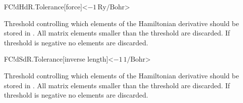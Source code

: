 \begin{fdfentry}{FC!dHdR.Tolerance}[force]<$-1\,\mathrm{Ry/Bohr}$>

  Threshold controlling which elements of the Hamiltonian derivative should be
  stored in . All matrix elements smaller than the threshold
  are discarded. If threshold is negative no elements are discarded.

\end{fdfentry}


\begin{fdfentry}{FC!dSdR.Tolerance}[inverse length]<$-1\,\mathrm{1/Bohr}$>

    Threshold controlling which elements of the Hamiltonian derivative should be
    stored in . All matrix elements smaller than the threshold
    are discarded. If threshold is negative no elements are discarded.
  
\end{fdfentry}
